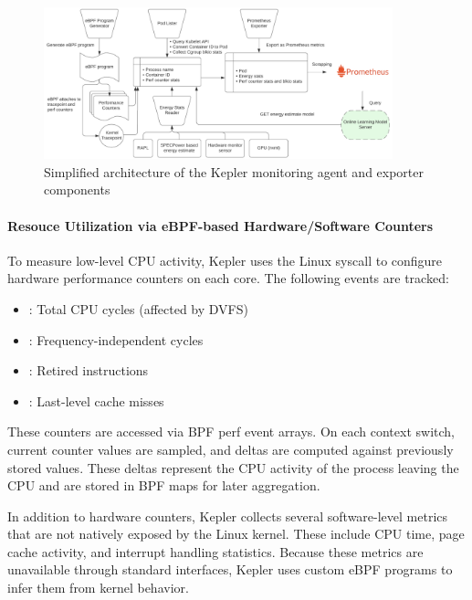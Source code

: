 \begin{figure}[ht]
  \centering
  \includegraphics[width=0.9\textwidth]{Figures/kepler_architecture.png}
  \caption{Simplified architecture of the Kepler monitoring agent and exporter components\parencite{kepler_docs}}
  \label{fig:kepler-architecture}
\end{figure}


\paragraph{Resouce Utilization via eBPF-based Hardware/Software Counters}

To measure low-level CPU activity, Kepler uses the Linux syscall  to configure hardware performance counters on each core. The following events are tracked:
\begin{itemize}
  \item {}: Total CPU cycles (affected by DVFS)
  \item {}: Frequency-independent cycles
  \item {}: Retired instructions
  \item {}: Last-level cache misses
\end{itemize}

These counters are accessed via BPF perf event arrays. On each context switch, current counter values are sampled, and deltas are computed against previously stored values. These deltas represent the CPU activity of the process leaving the CPU and are stored in BPF maps for later aggregation.

In addition to hardware counters, Kepler collects several software-level metrics that are not natively exposed by the Linux kernel. These include CPU time, page cache activity, and interrupt handling statistics. Because these metrics are unavailable through standard interfaces, Kepler uses custom eBPF programs to infer them from kernel behavior.

